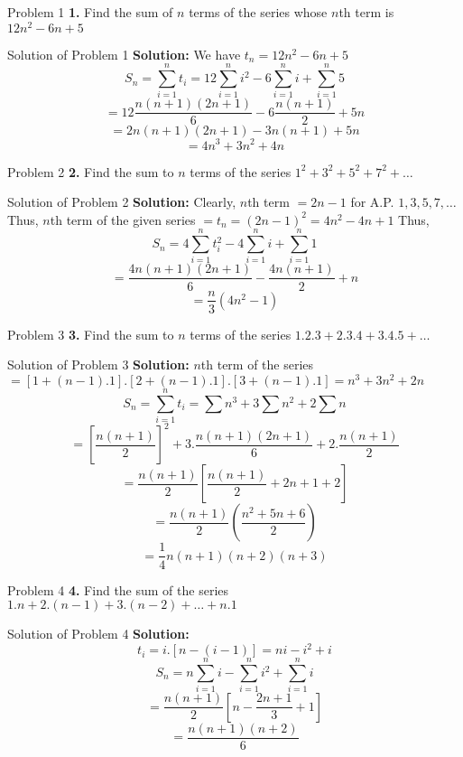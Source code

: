 \documentclass[aspectratio=1610,8pt]{beamer}
\begin{document}
\begin{frame}{Problem 1}
  \textbf{1.} Find the sum of $n$ terms of the series whose $n$th term is $12n^2 - 6n + 5$
\end{frame}
\begin{frame}{Solution of Problem 1}
  \textbf{Solution:} We have $t_n = 12n^2 - 6n + 5$
  $$S_n = \sum_{i=1}^nt_i = 12\sum_{i=1}^ni^2 - 6\sum_{i=1}^ni + \sum_{i=1}^n5$$
  $$= 12\frac{n(n + 1)(2n + 1)}{6} - 6\frac{n(n + 1)}{2} + 5n$$
  $$= 2n(n + 1)(2n + 1) -3n(n + 1) + 5n$$
  $$= 4n^3 + 3n^2 + 4n$$
\end{frame}
\begin{frame}{Problem 2}
  \textbf{2.} Find the sum to $n$ terms of the series $1^2 + 3^2 + 5^2 + 7^2 + \ldots$
\end{frame}
\begin{frame}{Solution of Problem 2}
  \textbf{Solution:} Clearly, $n$th term $= 2n - 1$ for A.P. $1, 3, 5, 7, \ldots$
  \vspace{5mm}\linebreak
  Thus, $n$th term of the given series $=t_n = (2n - 1)^2 = 4n^2 - 4n + 1$
  \vspace{5mm}\linebreak
  Thus, $$S_n = 4\sum_{i=1}^nt_i^2 - 4\sum_{i=1}^ni + \sum_{i=1}^n1$$
  $$= \frac{4n(n + 1)(2n + 1)}{6} - \frac{4n(n + 1)}{2} + n$$
  $$= \frac{n}{3}(4n^2 - 1)$$
\end{frame}
\begin{frame}{Problem 3}
  \textbf{3.} Find the sum to $n$ terms of the series $1.2.3 + 2.3.4 + 3.4.5 + \ldots$
\end{frame}
\begin{frame}{Solution of Problem 3}
  \textbf{Solution:} $n$th term of the series $= [1 + (n - 1).1].[2 + (n - 1).1].[3 + (n - 1).1] = n^3 + 3n^2 + 2n$
  $$S_n = \sum_{i=1}^nt_i = \sum n^3 + 3\sum n^2 + 2\sum n$$
  $$=\left[\frac{n(n + 1)}{2}\right]^2 + 3.\frac{n(n + 1)(2n + 1)}{6} + 2.\frac{n(n + 1)}{2}$$
  $$= \frac{n(n + 1)}{2}\left[\frac{n(n + 1)}{2} + 2n + 1 + 2\right]$$
  $$= \frac{n(n + 1)}{2}(\frac{n^2 + 5n + 6}{2})$$
  $$=\frac{1}{4}n(n + 1)(n + 2)(n + 3)$$
\end{frame}
\begin{frame}{Problem 4}
  \textbf{4.} Find the sum of the series $1.n + 2.(n - 1) + 3.(n - 2) + \ldots + n.1$
\end{frame}
\begin{frame}{Solution of Problem 4}
  \textbf{Solution:} $$t_i = i.[n - (i - 1)] = ni - i^2 + i$$
  $$S_n = n\sum_{i = 1}^ni - \sum_{i = 1}^ni^2 + \sum_{i = 1}^ni$$
  $$= \frac{n(n + 1)}{2}\left[n - \frac{2n + 1}{3} + 1\right]$$
  $$= \frac{n(n + 1)(n + 2)}{6}$$
\end{frame}
\end{document}
